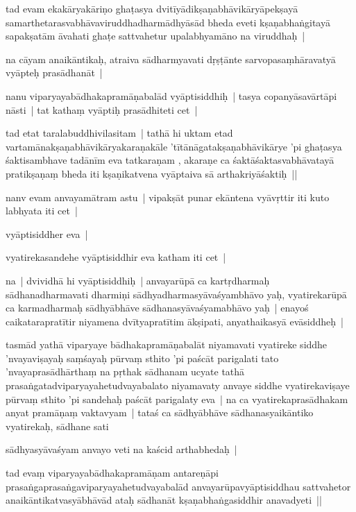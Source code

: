 \documentclass[article,a4paper]{memoir}
\begin{document}
	  \pstart tad evam ekakā\-ryakā\-riṇo ghaṭasya dvitī\-yā\-dikṣaṇabhā\-vikā\-ryā\-pekṣayā\- samarthetarasvabhā\-vaviruddhadharmā\-dhyā\-sā\-d bheda eveti kṣaṇabhaṅgitayā\- sapakṣatā\-m ā\-vahati ghaṭe sattvahetur upalabhyamā\-no na viruddhaḥ | 
	\pend
      

	  \pstart na cā\-yam anaikā\-ntikaḥ, atraiva sā\-dharmyavati dṛṣṭā\-nte sarvopasaṃhā\-ravatyā\- vyā\-pteḥ prasā\-dhanā\-t |
	\pend
      

	  \pstart nanu viparyayabā\-dhakapramā\-ṇabalā\-d vyā\-ptisiddhiḥ | tasya copanyā\-savā\-rtā\-pi nā\-sti | tat kathaṃ vyā\-ptiḥ prasā\-dhiteti cet | 
	\pend
      

	  \pstart tad etat taralabuddhivilasitam | tathā\- hi uktam etad vartamā\-nakṣaṇabhā\-vikā\-ryakaraṇakā\-le 'tī\-tā\-nā\-gatakṣaṇabhā\-vikā\-rye 'pi ghaṭasya śaktisambhave tadā\-nī\-m eva tatkaraṇam , akaraṇe ca śaktā\-śaktasvabhā\-vatayā\- pratikṣaṇaṃ bheda iti kṣaṇikatvena vyā\-ptaiva sā\- arthakriyā\-śaktiḥ || 
	\pend
      

	  \pstart nanv evam anvayamā\-tram astu | vipakṣā\-t punar ekā\-ntena vyā\-vṛttir iti kuto labhyata iti cet | 
	\pend
      

	  \pstart vyā\-ptisiddher eva |
	\pend
      

	  \pstart vyatirekasandehe vyā\-ptisiddhir eva katham iti cet | 
	\pend
      

	  \pstart na | dvividhā\- hi vyā\-ptisiddhiḥ | anvayarū\-pā\- ca kartṛdharmaḥ sā\-dhanadharmavati dharmiṇi sā\-dhyadharmasyā\-vaśyambhā\-vo yaḥ, vyatirekarū\-pā\- ca karmadharmaḥ sā\-dhyā\-bhā\-ve sā\-dhanasyā\-vaśyamabhā\-vo yaḥ | enayoś caikatarapratī\-tir niyamena dvī\-tyapratī\-tim ā\-kṣipati, anyathaikasyā\- evā\-siddheḥ |
	\pend
      

	  \pstart tasmā\-d yathā\- viparyaye bā\-dhakapramā\-ṇabalā\-t niyamavati vyatireke siddhe 'nvayaviṣayaḥ saṃśayaḥ pū\-rvaṃ sthito 'pi paścā\-t parigalati tato 'nvayaprasā\-dhā\-rthaṃ na pṛthak sā\-dhanam ucyate tathā\- prasaṅgatadviparyayahetudvayabalato niyamavaty anvaye siddhe vyatirekaviṣaye pū\-rvaṃ sthito 'pi sandehaḥ paścā\-t parigalaty eva | na ca vyatirekaprasā\-dhakam anyat pramā\-ṇaṃ vaktavyam | tataś ca sā\-dhyā\-bhā\-ve sā\-dhanasyaikā\-ntiko vyatirekaḥ, sā\-dhane sati
	\pend
      

	  \pstart sā\-dhyasyā\-vaśyam anvayo veti na kaścid arthabhedaḥ |
	\pend
      

	  \pstart tad evaṃ viparyayabā\-dhakapramā\-ṇam antareṇā\-pi prasaṅgaprasaṅgaviparyayahetudvayabalā\-d anvayarū\-pavyā\-ptisiddhau sattvahetor anaikā\-ntikatvasyā\-bhā\-vā\-d ataḥ sā\-dhanā\-t kṣaṇabhaṅgasiddhir anavadyeti ||
	\pend
      
\end{document}
